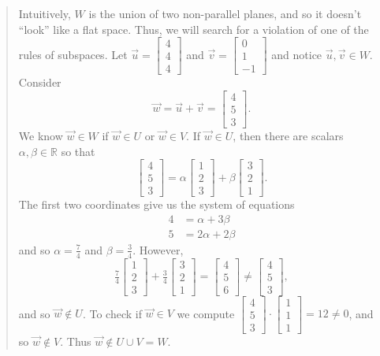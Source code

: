 \documentclass[letter]{article}
\newcommand{\R}{\mathbb{R}}
\newcommand{\mat}[1]{\begin{bmatrix}#1\end{bmatrix}}
\begin{document}
\begin{enumerate}
\begin{quote}
				Intuitively, $W$ is the union of two non-parallel planes, and so it doesn't
				``look'' like a flat space.  Thus, we will search for a violation of one of the rules
				of subspaces.  Let $\vec u=\mat{4\\4\\4}$ and $\vec v=\mat{0\\1\\-1}$ and notice $\vec u,\vec v\in W$.
				Consider
				\[
					\vec w = \vec u+\vec v = \mat{4\\5\\3}.
				\]
				We know $\vec w\in W$ if $\vec w\in U$ or $\vec w\in V$.  If $\vec w\in U$, then there are scalars $\alpha,\beta\in\R$
				so that
				\[
					\mat{4\\5\\3} = \alpha\mat{1\\2\\3}+\beta\mat{3\\2\\1}.
				\]
				The first two coordinates give us the system of equations
				\begin{align*}
					4&=\alpha+3\beta\\
					5&=2\alpha+2\beta
				\end{align*}
				and so $\alpha=\frac{7}{4}$ and $\beta=\frac{3}{4}$.  However,
				\[
					\tfrac{7}{4}\mat{1\\2\\3}+\tfrac{3}{4}\mat{3\\2\\1} = \mat{4\\5\\6}\neq \mat{4\\5\\3},
				\]
				and so $\vec w\notin U$.  To check if $\vec w\in V$ we compute $\mat{4\\5\\3}\cdot\mat{1\\1\\1} = 12\neq 0$,
				and so $\vec w\notin V$.  Thus $\vec w\notin U\cup V=W$.
			\end{quote}

	\end{enumerate}
\end{document}
